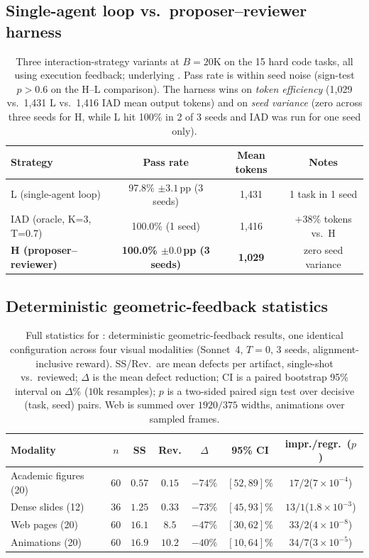 \subsection{Single-agent loop vs.\ proposer--reviewer harness}
\begin{table}[H]
\centering
\caption{Three interaction-strategy variants at $B{=}20$K on the 15 hard code tasks, all using execution feedback; underlying . Pass rate is within seed noise (sign-test $p{>}0.6$ on the H--L comparison). The harness wins on \emph{token efficiency} (1{,}029 vs.\ 1{,}431 L vs.\ 1{,}416 IAD mean output tokens) and on \emph{seed variance} (zero across three seeds for H, while L hit 100\% in 2 of 3 seeds and IAD was run for one seed only).}
\label{tab:LvsH}
\small
\begin{tabular}{lccc}
\toprule
Strategy & Pass rate & Mean tokens & Notes \\
\midrule
L (single-agent loop)              & 97.8\% $\pm 3.1$\,pp (3 seeds)           & 1{,}431          & 1 task in 1 seed \\
IAD (oracle, K=3, T=0.7)           & 100.0\% (1 seed)                         & 1{,}416          & $+38$\% tokens vs.\ H \\
\textbf{H (proposer--reviewer)}    & \textbf{100.0\% $\pm 0.0$\,pp (3 seeds)} & \textbf{1{,}029} & zero seed variance \\
\bottomrule
\end{tabular}
\end{table}

\subsection{Deterministic geometric-feedback statistics}
\begin{table}[H]
\centering\small
\caption{Full statistics for : deterministic geometric-feedback results, one identical configuration across four visual modalities (Sonnet~4, $T{=}0$, $3$ seeds, alignment-inclusive reward). SS/Rev.\ are mean defects per artifact, single-shot vs.\ reviewed; $\Delta$ is the mean defect reduction; CI is a paired bootstrap 95\% interval on $\Delta\%$ ($10$k resamples); $p$ is a two-sided paired sign test over decisive (task, seed) pairs. Web is summed over $1920/375$ widths, animations over sampled frames.}
\label{tab:geometric}
\begin{tabular}{lcccccc}
\toprule
Modality & $n$ & SS & Rev. & $\Delta$ & 95\% CI & impr./regr.\ ($p$) \\
\midrule
Academic figures (20) & 60 & $0.57$ & $0.15$ & $-74\%$ & $[52,89]\%$ & $17/2$\;($7{\times}10^{-4}$) \\
Dense slides (12)     & 36 & $1.25$ & $0.33$ & $-73\%$ & $[45,93]\%$ & $13/1$\;($1.8{\times}10^{-3}$) \\
Web pages (20)        & 60 & $16.1$ & $8.5$  & $-47\%$ & $[30,62]\%$ & $33/2$\;($4{\times}10^{-8}$) \\
Animations (20)       & 60 & $16.9$ & $10.2$ & $-40\%$ & $[10,64]\%$ & $34/7$\;($3{\times}10^{-5}$) \\
\bottomrule
\end{tabular}
\end{table}


